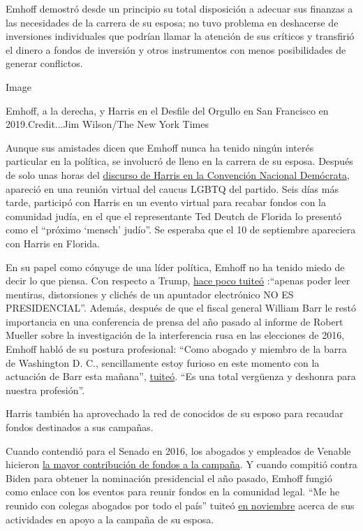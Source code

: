 Emhoff demostró desde un principio su total disposición a adecuar sus
finanzas a las necesidades de la carrera de su esposa; no tuvo problema
en deshacerse de inversiones individuales que podrían llamar la atención
de sus críticos y transfirió el dinero a fondos de inversión y otros
instrumentos con menos posibilidades de generar conflictos.

Image

Emhoff, a la derecha, y Harris en el Desfile del Orgullo en San
Francisco en 2019.Credit...Jim Wilson/The New York Times

Aunque sus amistades dicen que Emhoff nunca ha tenido ningún interés
particular en la política, se involucró de lleno en la carrera de su
esposa. Después de solo unas horas del
\href{https://www.nytimes3xbfgragh.onion/es/2020/08/20/espanol/estados-unidos/kamala-harris-discurso-completo.html}{discurso
de Harris en la Convención Nacional Demócrata}, apareció en una reunión
virtual del caucus LGBTQ del partido. Seis días más tarde, participó con
Harris en un evento virtual para recabar fondos con la comunidad judía,
en el que el representante Ted Deutch de Florida lo presentó como el
``próximo `mensch' judío''. Se esperaba que el 10 de septiembre
apareciera con Harris en Florida.

En su papel como cónyuge de una líder política, Emhoff no ha tenido
miedo de decir lo que piensa. Con respecto a Trump,
\href{https://twitter.com/douglasemhoff/status/1272931562166849536}{hace
poco tuiteó} :``apenas poder leer mentiras, distorsiones y clichés de un
apuntador electrónico NO ES PRESIDENCIAL''. Además, después de que el
fiscal general William Barr le restó importancia en una conferencia de
prensa del año pasado al informe de Robert Mueller sobre la
investigación de la interferencia rusa en las elecciones de 2016, Emhoff
habló de su postura profesional: ``Como abogado y miembro de la barra de
Washington D. C., sencillamente estoy furioso en este momento con la
actuación de Barr esta mañana'',
\href{https://twitter.com/douglasemhoff/status/1118909366147506176}{tuiteó}.
``Es una total vergüenza y deshonra para nuestra profesión''.

Harris también ha aprovechado la red de conocidos de su esposo para
recaudar fondos destinados a sus campañas.

Cuando contendió para el Senado en 2016, los abogados y empleados de
Venable hicieron
\href{https://www.opensecrets.org/races/contributors?cycle=2016\&id=CAS1\&spec=N}{la
mayor contribución de fondos a la campaña}. Y cuando compitió contra
Biden para obtener la nominación presidencial el año pasado, Emhoff
fungió como enlace con los eventos para reunir fondos en la comunidad
legal. ``Me he reunido con colegas abogados por todo el país'' tuiteó
\href{https://twitter.com/douglasemhoff/status/1191384270469599232}{en
noviembre} acerca de sus actividades en apoyo a la campaña de su esposa.

